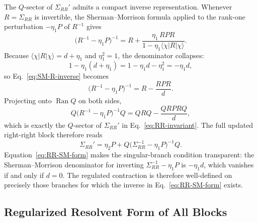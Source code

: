 \documentclass[aps,prb,onecolumn,nofootinbib,superscriptaddress]{revtex4-2}
\newcommand{\Ran}{\operatorname{Ran}}
\theoremstyle{plain}
\theoremstyle{definition}
\begin{document}
The \(Q\)-sector of \(\Sigma_{RR}'\) admits a compact inverse
representation.  Whenever \(R=\Sigma_{RR}\) is invertible, the
Sherman--Morrison formula applied to the rank-one perturbation
\(-\eta_1 P\) of \(R^{-1}\) gives
\begin{equation}
  \bigl(R^{-1}-\eta_1 P\bigr)^{-1}
  =
  R
  +
  \frac{\eta_1\,RPR}
       {1-\eta_1\langle\chi\rvert R\lvert\chi\rangle}.
  \label{eq:SM-R-inverse}
\end{equation}
Because \(\langle\chi\rvert R\lvert\chi\rangle = d+\eta_1\) and
\(\eta_1^2=1\), the denominator collapses:
\begin{equation}
  1-\eta_1(d+\eta_1)
  =
  1-\eta_1 d-\eta_1^2
  =
  -\eta_1 d,
  \label{eq:SM-denom}
\end{equation}
so Eq.~\eqref{eq:SM-R-inverse} becomes
\begin{equation}
  \bigl(R^{-1}-\eta_1 P\bigr)^{-1}
  =
  R-\frac{RPR}{d}.
  \label{eq:SM-simplified}
\end{equation}
Projecting onto \(\Ran Q\) on both sides,
\begin{equation}
  Q\bigl(R^{-1}-\eta_1 P\bigr)^{-1}Q
  =
  QRQ-\frac{QRPRQ}{d},
  \label{eq:SM-projected}
\end{equation}
which is exactly the \(Q\)-sector of \(\Sigma_{RR}'\) in
Eq.~\eqref{eq:RR-invariant}.  The full updated right-right block
therefore reads
\begin{equation}
  \boxed{
  \Sigma_{RR}'
  =
  \eta_2 P
  +
  Q\bigl(\Sigma_{RR}^{-1}-\eta_1 P\bigr)^{-1}Q.
  }
  \label{eq:RR-SM-form}
\end{equation}
Equation~\eqref{eq:RR-SM-form} makes the singular-branch condition
transparent: the Sherman--Morrison denominator for inverting
\(\Sigma_{RR}^{-1}-\eta_1 P\) is \(-\eta_1 d\), which vanishes if and only
if \(d=0\).  The regulated contraction is therefore well-defined on precisely
those branches for which the inverse in
Eq.~\eqref{eq:RR-SM-form} exists.

\subsection{Regularized Resolvent Form of All Blocks}
\label{subsec:regularized-resolvent-blocks}
\end{document}
